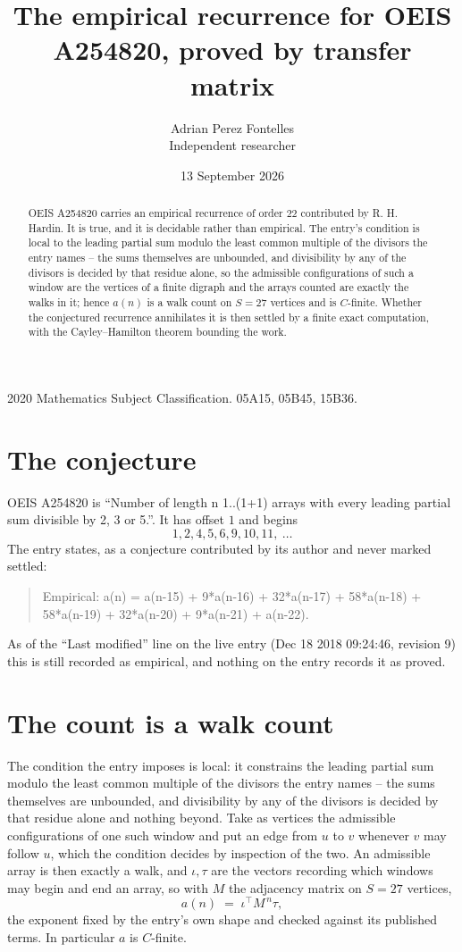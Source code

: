 \documentclass[11pt,a4paper]{article}
\title{The empirical recurrence for OEIS A254820, proved by transfer matrix}
\author{Adrian Perez Fontelles\\ \small Independent researcher}
\date{13 September 2026}
\theoremstyle{plain}
\theoremstyle{definition}
\begin{document}
\maketitle

\begin{abstract}
OEIS A254820 carries an empirical recurrence of order $22$ contributed by R. H. Hardin. It is
true, and it is decidable rather than empirical. The entry's condition is local to the leading partial sum modulo the least common multiple of the divisors the entry names -- the sums themselves are unbounded, and divisibility by any of the divisors is decided by that residue alone, so
the admissible configurations of such a window are the vertices of a finite digraph and the
arrays counted are exactly the walks in it; hence $a(n)$ is a walk count on $S=27$ vertices
and is $C$-finite. Whether the conjectured recurrence annihilates it is then settled by a
finite exact computation, with the Cayley--Hamilton theorem bounding the work.
\end{abstract}

\noindent\small 2020 Mathematics Subject Classification. 05A15, 05B45, 15B36.\normalsize

\section{The conjecture}

OEIS A254820 is ``Number of length n 1..(1+1) arrays with every leading partial sum divisible by 2, 3 or 5.''. It has offset $1$ and begins
\[
1, 2, 4, 5, 6, 9, 10, 11,\ \dots
\]
The entry states, as a conjecture contributed by its author and never marked settled:
\begin{quote}
Empirical: a(n) = a(n-15) + 9*a(n-16) + 32*a(n-17) + 58*a(n-18) + 58*a(n-19) + 32*a(n-20) + 9*a(n-21) + a(n-22).
\end{quote}
As of the ``Last modified'' line on the live entry (Dec 18 2018 09:24:46, revision 9) this is still
recorded as empirical, and nothing on the entry records it as proved.

\section{The count is a walk count}

The condition the entry imposes is local: it constrains the leading partial sum modulo the least common multiple of the divisors the entry names -- the sums themselves are unbounded, and divisibility by any of the divisors is decided by that residue alone and nothing beyond. Take as vertices the admissible configurations of one such window and put an edge from $u$ to $v$ whenever $v$ may follow $u$, which the condition decides by inspection of the two.
An admissible array is then exactly a walk, and $\iota,\tau$ are the vectors recording which windows may begin and end an array, so with $M$ the adjacency matrix on $S=27$ vertices,
\[
a(n)\;=\;\iota^{\!\top}M^{\,n}\tau ,
\]
the exponent fixed by the entry's own shape and checked against its published terms. In
particular $a$ is $C$-finite.
\end{document}
